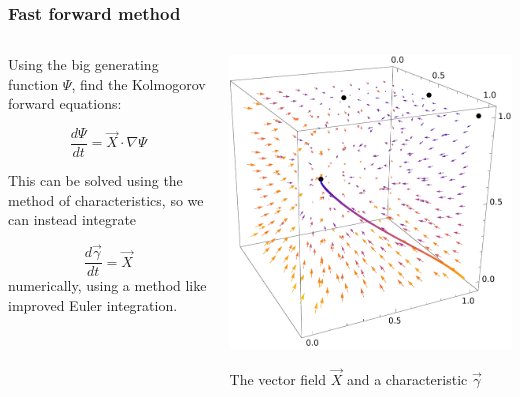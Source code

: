 \documentclass{beamer}
\begin{document}
\begin{frame}
    \frametitle{Fast forward method}

    \begin{columns}
        \begin{column}{0.5\textwidth}
    Using the big generating function $\Psi$, find the Kolmogorov forward
    equations:

    \begin{equation}
        \frac{d \Psi}{ dt} = \vec{X} \cdot \nabla \Psi
    \end{equation}

    This can be solved using the method of characteristics, so we can instead
    integrate

    \begin{equation}
        \frac{d \vec{\gamma}}{ dt} = \vec{X}
    \end{equation}
    numerically, using a method like improved Euler integration.


        \end{column}
        \begin{column}{0.5\textwidth}
            \includegraphics[width=\textwidth]{figures/flowcube1}

            \;

            The vector field $\vec{X}$ and a characteristic $\vec{\gamma}$
        \end{column}
    \end{columns}
\end{frame}
\end{document}
